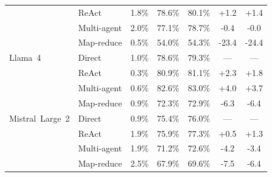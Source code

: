 \begin{table}[t]
\begin{tabular}{@{}llccccc@{}}
   & ReAct & 1.8\% & 78.6\% & 80.1\% & +1.2 & +1.4 \\
   & Multi-agent & 2.0\% & 77.1\% & 78.7\% & -0.4 & -0.0 \\
   & Map-reduce & 0.5\% & 54.0\% & 54.3\% & -23.4 & -24.4 \\
\addlinespace[3pt]
  Llama~4 & Direct & 1.0\% & 78.6\% & 79.3\% & --- & --- \\
   & ReAct & 0.3\% & 80.9\% & 81.1\% & +2.3 & +1.8 \\
   & Multi-agent & 0.6\% & 82.6\% & 83.0\% & +4.0 & +3.7 \\
   & Map-reduce & 0.9\% & 72.3\% & 72.9\% & -6.3 & -6.4 \\
\addlinespace[3pt]
  Mistral~Large~2 & Direct & 0.9\% & 75.4\% & 76.0\% & --- & --- \\
   & ReAct & 1.9\% & 75.9\% & 77.3\% & +0.5 & +1.3 \\
   & Multi-agent & 1.9\% & 71.2\% & 72.6\% & -4.2 & -3.4 \\
   & Map-reduce & 2.5\% & 67.9\% & 69.6\% & -7.5 & -6.4 \\
\bottomrule
\end{tabular}
\end{table}

